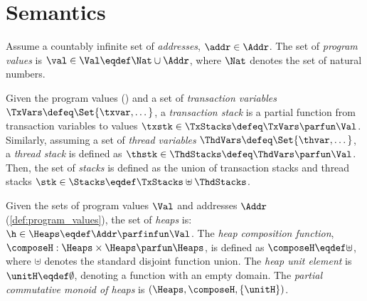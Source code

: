 \section{Semantics\label{sec:semantics}}
\begin{defn}
\label{def:program_values}
Assume a countably infinite set of \emph{addresses}, $\addr \in \Addr$. The set of \emph{program values} is $\val \in \Val \eqdef \Nat \cup \Addr$, where $\Nat$ denotes the set of natural numbers.
\end{defn}
 
\begin{defn}[Stacks]
\label{def:stacks}
Given the program values () and a set of \emph{transaction variables} \( \TxVars \defeq \Set{\txvar, \dots}\), a \emph{transaction stack} is a partial function from transaction variables to values \( \txstk \in \TxStacks \defeq \TxVars \parfun \Val \).
Similarly, assuming a set of \emph{thread variables} \( \ThdVars \defeq \Set{\thvar, \dots}\), a \emph{thread stack} is defined as \( \thstk \in \ThdStacks \defeq \ThdVars \parfun \Val \).
Then, the set of \emph{stacks} is defined as the union of transaction stacks and thread stacks \( \stk \in \Stacks \eqdef \TxStacks \uplus \ThdStacks \).
\end{defn}

\begin{definition}[Heaps]
\label{def:heaps}
Given the sets of program values $\Val$  and addresses \( \Addr\)  (\ref{def:program_values}), the set of \emph{heaps} is: $\h \in \Heaps \eqdef \Addr \parfinfun \Val$.
The \emph{heap composition function}, $\composeH: \Heaps \times \Heaps \parfun \Heaps$, is defined as $\composeH \eqdef \uplus$, where $\uplus$ denotes the standard disjoint function union. The \emph{ heap unit element} is $\unitH \eqdef \emptyset$, denoting a function with an empty domain.
The \emph{partial commutative monoid of  heaps} is $(\Heaps, \composeH, \{\unitH\})$.
\end{definition}

